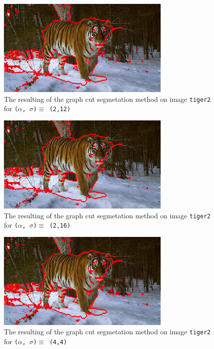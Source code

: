 {  \begin{minipage}{0.45\linewidth}
    \begin{figure}[H]
      \includegraphics[scale=0.5]{./images/04/Q11/var_a_b/tiger2/graphcut2_a2_s12.png}
      \caption{The resulting of the graph cut segmetation method on image \texttt{tiger2} for
        \texttt{($\alpha$, $\sigma$)$ \equiv$ (2,12)}}
      \label{fig:04_tiger22_a2_s12}
    \end{figure}
    \vfill
    \begin{figure}[H]
      \includegraphics[scale=0.5]{./images/04/Q11/var_a_b/tiger2/graphcut2_a2_s16.png}
      \caption{The resulting of the graph cut segmetation method on image \texttt{tiger2} for
        \texttt{($\alpha$, $\sigma$)$ \equiv$ (2,16)}}
      \label{fig:04_tiger22_a2_s16}
    \end{figure}
    \vfill
    \begin{figure}[H]
      \includegraphics[scale=0.5]{./images/04/Q11/var_a_b/tiger2/graphcut2_a4_s4.png}
      \caption{The resulting of the graph cut segmetation method on image \texttt{tiger2} for
        \texttt{($\alpha$, $\sigma$)$ \equiv$ (4,4)}}
      \label{fig:04_tiger22_a4_s4}
    \end{figure}
  \end{minipage}
}


